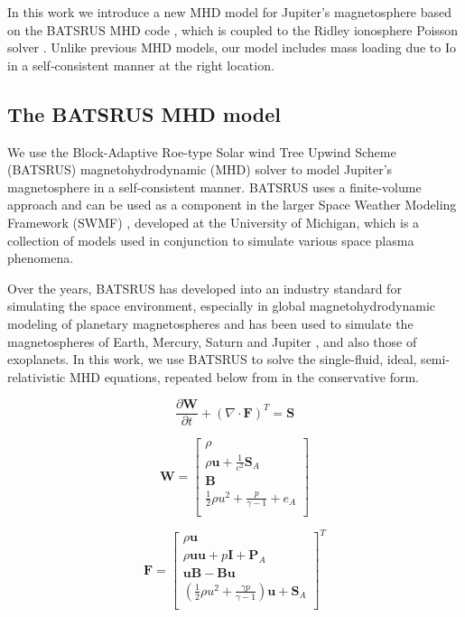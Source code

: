 In this work we introduce a new MHD model for Jupiter's magnetosphere based on the BATSRUS MHD code \cite{Powell1999a,Gombosi2002b}, which is coupled to the Ridley ionosphere Poisson solver \cite{Ridley2004IonosphericConductance}. Unlike previous MHD models, our model includes mass loading due to Io in a self‐consistent manner at the right location. 

\subsection{The BATSRUS MHD model}
We use the Block-Adaptive Roe-type Solar wind Tree Upwind Scheme (BATSRUS) magnetohydrodynamic (MHD) solver to model Jupiter's magnetosphere in a self-consistent manner. BATSRUS uses a finite-volume approach and can be used as a component in the larger Space Weather Modeling Framework (SWMF) \cite{Toth2012a}, developed at the University of Michigan, which is a collection of models used in conjunction to simulate various space plasma phenomena. 

Over the years, BATSRUS has developed into an industry standard for simulating the space environment, especially in global magnetohydrodynamic modeling of planetary magnetospheres and has been used to simulate the magnetospheres of Earth, Mercury, Saturn \cite{Jia2012} and Jupiter \cite{Hansen2001a}, and also those of exoplanets. In this work, we use BATSRUS to solve the single-fluid, ideal, semi-relativistic MHD equations, repeated below from  in the conservative form. 

\begin{equation}
    \frac{\partial \mathbf{W}}{\partial t} + \left(\nabla \cdot \mathbf{F} \right)^T = \mathbf{S}
\end{equation}

\begin{equation}
    \mathbf{W} = \left[ \begin{array}{c}
    \rho\\
    \rho \mathbf{u} + \frac{1}{c^2}\mathbf{S}_A\\ 
    \mathbf{B}     \\
    \frac{1}{2}\rho u^2 + \frac{p}{\gamma - 1} + e_A\\
    \end{array} \right]
\end{equation}


\begin{equation}
    \mathbf{F} = \left[ \begin{array}{c}
    \rho \mathbf{u}\\
    \rho \mathbf{u} \mathbf{u} + p\mathbf{I} + \mathbf{P}_A\\ 
    \mathbf{u}\mathbf{B} - \mathbf{B}\mathbf{u}\\
    \left(\frac{1}{2}\rho u^2 + \frac{\gamma p}{\gamma - 1}\right)\mathbf{u} + \mathbf{S}_A\\
    \end{array} \right]^T
\end{equation}

